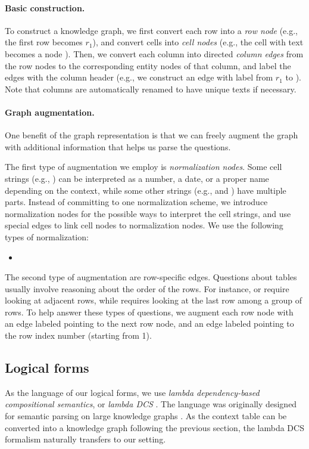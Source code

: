 \paragraph{Basic construction.}
To construct a knowledge graph,
we first convert each row into a \emph{row node}
(e.g., the first row becomes $r_1$),
and convert cells into \emph{cell nodes}
(e.g., the cell with text 
becomes a node ).
Then, we convert each column into directed \emph{column edges}
from the row nodes to the corresponding entity nodes
of that column,
and label the edges with the column header
(e.g., we construct an edge with label 
from $r_1$ to ).
Note that columns are automatically renamed
to have unique texts if necessary.

\paragraph{Graph augmentation.}
One benefit of the graph representation
is that we can freely augment the graph with 
additional information that helps us parse the questions.

The first type of augmentation we employ is
\emph{normalization nodes}.
Some cell strings (e.g., )
can be interpreted as a number, a date, or a proper name
depending on the context,
while some other strings (e.g.,  and )
have multiple parts.
Instead of committing to one normalization scheme,
we introduce normalization nodes for the possible ways
to interpret the cell strings,
and use special edges to link cell nodes to normalization nodes.
We use the following types of normalization:

\begin{itemize}
\item {}
\end{itemize}

The second type of augmentation are row-specific edges.
Questions about tables usually involve reasoning about the
order of the rows. For instance,
 or 
require looking at adjacent rows,
while  requires looking
at the last row among a group of rows.
To help answer these types of questions,
we augment each row node with an edge labeled 
pointing to the next row node,
and an edge labeled  pointing to the row index number
(starting from 1).

\subsection{Logical forms}\label{sec:logical-forms}
As the language of our logical forms,
we use \emph{lambda dependency-based
compositional semantics}, or \emph{lambda DCS}
\cite{Liang2013LambdaDC}.
The language was originally designed for semantic parsing
on large knowledge graphs
\cite{Berant2013SemanticPO}.
As the context table can be converted into a knowledge graph
following the previous section,
the lambda DCS formalism naturally transfers to our setting.

